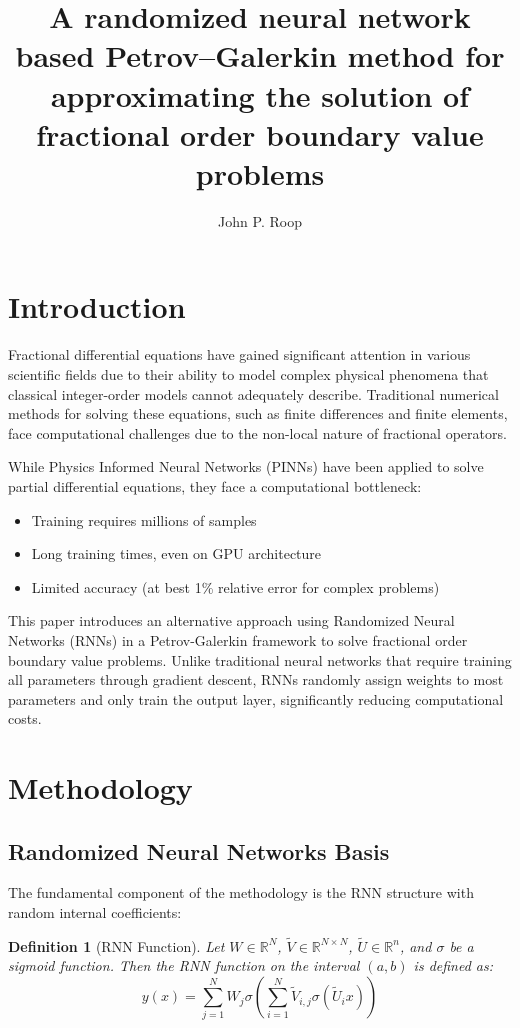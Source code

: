 \documentclass[11pt]{article}
\title{A randomized neural network based Petrov--Galerkin method for approximating the solution of fractional order boundary value problems}
\author{John P. Roop}
\date{}
\newtheorem{definition}{Definition}
\begin{document}
\maketitle

\section{Introduction}

Fractional differential equations have gained significant attention in various scientific fields due to their ability to model complex physical phenomena that classical integer-order models cannot adequately describe. Traditional numerical methods for solving these equations, such as finite differences and finite elements, face computational challenges due to the non-local nature of fractional operators.

While Physics Informed Neural Networks (PINNs) have been applied to solve partial differential equations, they face a computational bottleneck:
\begin{itemize}
    \item Training requires millions of samples
    \item Long training times, even on GPU architecture
    \item Limited accuracy (at best 1\% relative error for complex problems)
\end{itemize}

This paper introduces an alternative approach using Randomized Neural Networks (RNNs) in a Petrov-Galerkin framework to solve fractional order boundary value problems. Unlike traditional neural networks that require training all parameters through gradient descent, RNNs randomly assign weights to most parameters and only train the output layer, significantly reducing computational costs.

\section{Methodology}

\subsection{Randomized Neural Networks Basis}

The fundamental component of the methodology is the RNN structure with random internal coefficients:

\begin{definition}[RNN Function]
Let $W \in \mathbb{R}^N$, $\tilde{V} \in \mathbb{R}^{N \times N}$, $\tilde{U} \in \mathbb{R}^n$, and $\sigma$ be a sigmoid function. Then the RNN function on the interval $(a,b)$ is defined as:
\begin{equation}
y(x) = \sum_{j=1}^{N} W_j \sigma\left(\sum_{i=1}^{N} \tilde{V}_{i,j} \sigma(\tilde{U}_i x)\right)
\end{equation}
\end{definition}
\end{document}
